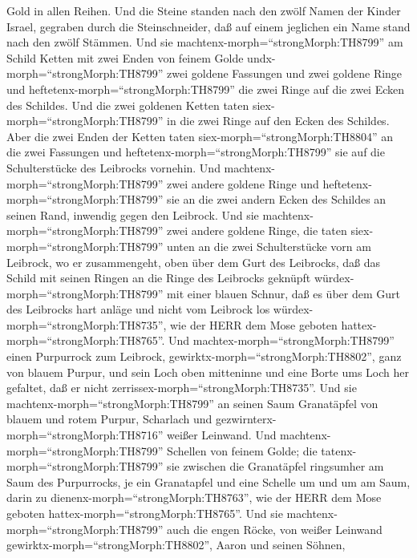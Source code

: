 Gold in allen Reihen.  Und die Steine standen nach den
zwölf Namen der Kinder Israel, gegraben durch die Steinschneider, daß
auf einem jeglichen ein Name stand nach den zwölf Stämmen. 
Und sie machtenx-morph=``strongMorph:TH8799'' am Schild Ketten mit zwei
Enden von feinem Golde  undx-morph=``strongMorph:TH8799''
zwei goldene Fassungen und zwei goldene Ringe und
heftetenx-morph=``strongMorph:TH8799'' die zwei Ringe auf die zwei Ecken
des Schildes.  Und die zwei goldenen Ketten taten
siex-morph=``strongMorph:TH8799'' in die zwei Ringe auf den Ecken des
Schildes.  Aber die zwei Enden der Ketten taten
siex-morph=``strongMorph:TH8804'' an die zwei Fassungen und
heftetenx-morph=``strongMorph:TH8799'' sie auf die Schulterstücke des
Leibrocks vornehin.  Und
machtenx-morph=``strongMorph:TH8799'' zwei andere goldene Ringe und
heftetenx-morph=``strongMorph:TH8799'' sie an die zwei andern Ecken des
Schildes an seinen Rand, inwendig gegen den Leibrock.  Und
sie machtenx-morph=``strongMorph:TH8799'' zwei andere goldene Ringe, die
taten siex-morph=``strongMorph:TH8799'' unten an die zwei Schulterstücke
vorn am Leibrock, wo er zusammengeht, oben über dem Gurt des Leibrocks,
 daß das Schild mit seinen Ringen an die Ringe des
Leibrocks geknüpft würdex-morph=``strongMorph:TH8799'' mit einer blauen
Schnur, daß es über dem Gurt des Leibrocks hart anläge und nicht vom
Leibrock los würdex-morph=``strongMorph:TH8735'', wie der HERR dem Mose
geboten hattex-morph=``strongMorph:TH8765''.  Und
machtex-morph=``strongMorph:TH8799'' einen Purpurrock zum Leibrock,
gewirktx-morph=``strongMorph:TH8802'', ganz von blauem Purpur,
 und sein Loch oben mitteninne und eine Borte ums Loch her
gefaltet, daß er nicht zerrissex-morph=``strongMorph:TH8735''.
 Und sie machtenx-morph=``strongMorph:TH8799'' an seinen
Saum Granatäpfel von blauem und rotem Purpur, Scharlach und
gezwirnterx-morph=``strongMorph:TH8716'' weißer Leinwand. 
Und machtenx-morph=``strongMorph:TH8799'' Schellen von feinem Golde; die
tatenx-morph=``strongMorph:TH8799'' sie zwischen die Granatäpfel
ringsumher am Saum des Purpurrocks,  je ein Granatapfel und
eine Schelle um und um am Saum, darin zu
dienenx-morph=``strongMorph:TH8763'', wie der HERR dem Mose geboten
hattex-morph=``strongMorph:TH8765''.  Und sie
machtenx-morph=``strongMorph:TH8799'' auch die engen Röcke, von weißer
Leinwand gewirktx-morph=``strongMorph:TH8802'', Aaron und seinen Söhnen,
